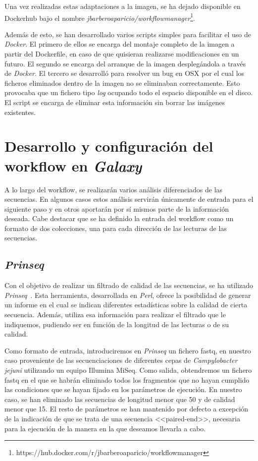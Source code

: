 Una vez realizadas estas adaptaciones a la imagen, se ha dejado disponible en Dockerhub bajo el nombre \textit{jbarberoaparicio/workflowmanager}\footnote{https://hub.docker.com/r/jbarberoaparicio/workflowmanager}. 

Además de esto, se han desarrollado varios scripts simples para facilitar el uso de \textit{Docker}. El primero de ellos se encarga del montaje completo de la imagen a partir del Dockerfile, en caso de que quisieran realizarse modificaciones en un futuro. El segundo se encarga del arranque de la imagen desplegándola a través de \textit{Docker}. El tercero se desarrolló para resolver un bug en OSX por el cual los ficheros eliminados dentro de la imagen no se eliminaban correctamente. Esto provocaba que un fichero tipo \textit{log} ocupando todo el espacio disponible en el disco. El script se encarga de eliminar esta información sin borrar las imágenes existentes.


\section{Desarrollo y configuración del workflow en \itshape{Galaxy}}
A lo largo del workflow, se realizarán varios análisis diferenciados de las secuencias. En algunos casos estos análisis servirán  únicamente de entrada para el siguiente paso y en otros aportarán por sí mismos parte de la información deseada. 
Cabe destacar que se ha definido la entrada del workflow como un formato de dos colecciones, una para cada dirección de las lecturas de las secuencias. 

\subsection{\itshape{Prinseq}}
Con el objetivo de realizar un filtrado de calidad de las secuencias, se ha utilizado \textit{Prinseq}~\cite{schmieder_prinseq}. Esta herramienta, desarrollada en \textit{Perl}, ofrece la posibilidad de generar un informe en el cual se indican diferentes estadísticas sobre la calidad de cierta secuencia. Además, utiliza esa información para realizar el filtrado que le indiquemos, pudiendo ser en función de la longitud de las lecturas o de su calidad.

Como formato de entrada, introduciremos en \textit{Prinseq} un fichero fastq, en nuestro caso proveniente de las secuenciaciones de diferentes cepas de \textit{Campylobacter jejuni} utilizando un equipo Illumina MiSeq. Como salida, obtendremos un fichero fastq en el que se habrán eliminado todos los fragmentos que no hayan cumplido las condiciones que se hayan fijado en los parámetros de ejecución. En nuestro caso, se han eliminado las secuencias de longitud menor que 50 y de calidad menor que 15. El resto de parámetros se han mantenido por defecto a excepción de la indicación de que se trata de una secuencia <<paired-end>>, necesaria para la ejecución de la manera en la que deseamos llevarla a cabo.

